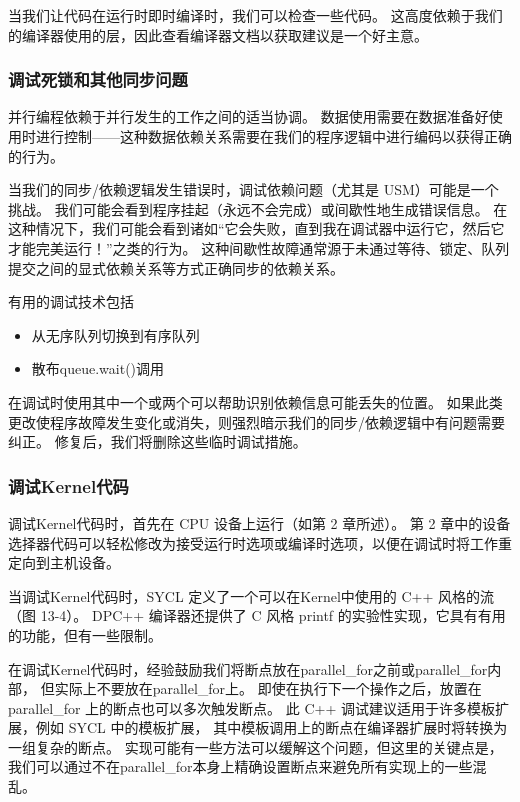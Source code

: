 当我们让代码在运行时即时编译时，我们可以检查一些代码。 
这高度依赖于我们的编译器使用的层，因此查看编译器文档以获取建议是一个好主意。

\subsubsection{调试死锁和其他同步问题}
并行编程依赖于并行发生的工作之间的适当协调。 
数据使用需要在数据准备好使用时进行控制——这种数据依赖关系需要在我们的程序逻辑中进行编码以获得正确的行为。

当我们的同步/依赖逻辑发生错误时，调试依赖问题（尤其是 USM）可能是一个挑战。 
我们可能会看到程序挂起（永远不会完成）或间歇性地生成错误信息。 
在这种情况下，我们可能会看到诸如“它会失败，直到我在调试器中运行它，然后它才能完美运行！”之类的行为。 
这种间歇性故障通常源于未通过等待、锁定、队列提交之间的显式依赖关系等方式正确同步的依赖关系。

有用的调试技术包括

\begin{itemize}
	\item 从无序队列切换到有序队列

	\item 散布queue.wait()调用
\end{itemize}

在调试时使用其中一个或两个可以帮助识别依赖信息可能丢失的位置。 
如果此类更改使程序故障发生变化或消失，则强烈暗示我们的同步/依赖逻辑中有问题需要纠正。 
修复后，我们将删除这些临时调试措施。

\subsubsection{调试Kernel代码}
调试Kernel代码时，首先在 CPU 设备上运行（如第 2 章所述）。 
第 2 章中的设备选择器代码可以轻松修改为接受运行时选项或编译时选项，以便在调试时将工作重定向到主机设备。

当调试Kernel代码时，SYCL 定义了一个可以在Kernel中使用的 C++ 风格的流（图 13-4）。 
DPC++ 编译器还提供了 C 风格 printf 的实验性实现，它具有有用的功能，但有一些限制。

在调试Kernel代码时，经验鼓励我们将断点放在parallel\_for之前或parallel\_for内部，
但实际上不要放在parallel\_for上。 即使在执行下一个操作之后，放置在parallel\_for 上的断点也可以多次触发断点。 
此 C++ 调试建议适用于许多模板扩展，例如 SYCL 中的模板扩展，
其中模板调用上的断点在编译器扩展时将转换为一组复杂的断点。 
实现可能有一些方法可以缓解这个问题，但这里的关键点是，
我们可以通过不在parallel\_for本身上精确设置断点来避免所有实现上的一些混乱。

